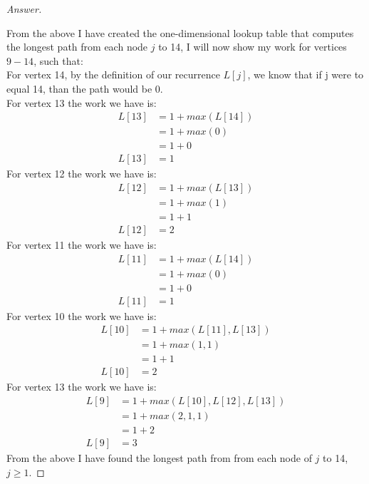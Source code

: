 \documentclass[11pt]{article}
\theoremstyle{definition}
\theoremstyle{definition}
\theoremstyle{definition}
\begin{document}
\begin{proof}[Answer]
\begin{center}
{}
\end{center}
From the above I have created the one-dimensional lookup table that computes the longest path from each node $j$ to 14, I will now show my work for vertices $9 - 14$, such that: \\
For vertex 14, by the definition of our recurrence $L[j]$, we know that if j were to equal 14, than the path would be 0. \\
For vertex 13 the work we have is: \\
\begin{align*}
L[13] &= 1 + max(L[14]) \\
&= 1 + max(0) \\
&= 1 + 0 \\
L[13] &= 1
\end{align*}
For vertex 12 the work we have is: \\
\begin{align*}
L[12] &= 1 + max(L[13]) \\
&= 1 + max(1) \\
&= 1 + 1 \\
L[12] &= 2
\end{align*}
For vertex 11 the work we have is: \\
\begin{align*}
L[11] &= 1 + max(L[14]) \\
&= 1 + max(0) \\
&= 1 + 0 \\
L[11] &= 1
\end{align*}
For vertex 10 the work we have is: \\
\begin{align*}
L[10] &= 1 + max(L[11], L[13]) \\
&= 1 + max(1, 1) \\
&= 1 + 1 \\
L[10] &= 2
\end{align*}
For vertex 13 the work we have is: \\
\begin{align*}
L[9] &= 1 + max(L[10], L[12], L[13]) \\
&= 1 + max(2, 1, 1) \\
&= 1 + 2 \\
L[9] &= 3
\end{align*}
From the above I have found the longest path from from each node of $j$ to 14, $j \geq 1$. 
\end{proof}

\end{document}
